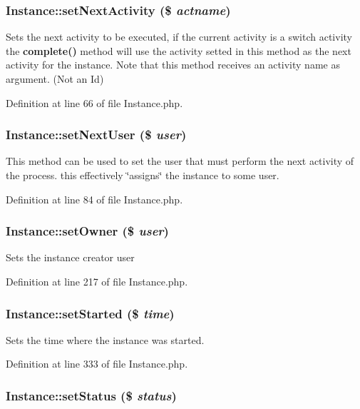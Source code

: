\subsubsection{\setlength{\rightskip}{0pt plus 5cm}Instance::set\-Next\-Activity (\$ {\em actname})}\label{classInstance_a2}


Sets the next activity to be executed, if the current activity is a switch activity the {\bf complete()} method will use the activity setted in this method as the next activity for the instance. Note that this method receives an activity name as argument. (Not an Id) 

Definition at line 66 of file Instance.php.
\subsubsection{\setlength{\rightskip}{0pt plus 5cm}Instance::set\-Next\-User (\$ {\em user})}\label{classInstance_a3}


This method can be used to set the user that must perform the next activity of the process. this effectively \char`\"{}assigns\char`\"{} the instance to some user. 

Definition at line 84 of file Instance.php.
\subsubsection{\setlength{\rightskip}{0pt plus 5cm}Instance::set\-Owner (\$ {\em user})}\label{classInstance_a12}


Sets the instance creator user 

Definition at line 217 of file Instance.php.
\subsubsection{\setlength{\rightskip}{0pt plus 5cm}Instance::set\-Started (\$ {\em time})}\label{classInstance_a19}


Sets the time where the instance was started. 

Definition at line 333 of file Instance.php.
\subsubsection{\setlength{\rightskip}{0pt plus 5cm}Instance::set\-Status (\$ {\em status})}\label{classInstance_a8}


